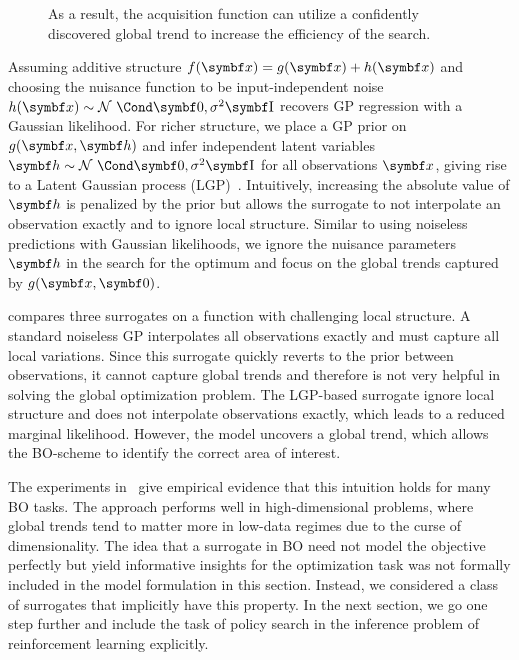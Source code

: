 \begin{figure}[t]
    \centering
    \caption{
        \label{fig:bo:posterior}
        As a result, the acquisition function can utilize a confidently discovered global trend to increase the efficiency of the search.
    }
\end{figure}
Assuming additive structure $f(\mat{x}) = g(\mat{x}) + h(\mat{x})$ and choosing the nuisance function to be input-independent noise $h(\mat{x}) \sim \Gaussian{\mat{0}, \sigma^2 \Eye}$ recovers GP regression with a Gaussian likelihood.
For richer structure, we place a GP prior on $g(\mat{x}, \mat{h})$ and infer independent latent variables $\mat{h} \sim \Gaussian{\mat{0}, \sigma^2 \Eye}$ for all observations $\mat{x}$, giving rise to a Latent Gaussian process (LGP)~\parencite{pfingsten_nonstationary_2006,wang_gaussian_2012,yousefi_unsupervised_2016,bodin_latent_2017}.
Intuitively, increasing the absolute value of $\mat{h}$ is penalized by the prior but allows the surrogate to not interpolate an observation exactly and to ignore local structure.
Similar to using noiseless predictions with Gaussian likelihoods, we ignore the nuisance parameters $\mat{h}$ in the search for the optimum and focus on the global trends captured by $g(\mat{x}, \mat{0})$.

 compares three surrogates on a function with challenging local structure.
A standard noiseless GP interpolates all observations exactly and must capture all local variations.
Since this surrogate quickly reverts to the prior between observations, it cannot capture global trends and therefore is not very helpful in solving the global optimization problem.
The LGP-based surrogate ignore local structure and does not interpolate observations exactly, which leads to a reduced marginal likelihood.
However, the model uncovers a global trend, which allows the BO-scheme to identify the correct area of interest.

The experiments in~\parencite{bodin_modulating_2020} give empirical evidence that this intuition holds for many BO tasks.
The approach performs well in high-dimensional problems, where global trends tend to matter more in low-data regimes due to the curse of dimensionality.
The idea that a surrogate in BO need not model the objective perfectly but yield informative insights for the optimization task was not formally included in the model formulation in this section.
Instead, we considered a class of surrogates that implicitly have this property.
In the next section, we go one step further and include the task of policy search in the inference problem of reinforcement learning explicitly.


